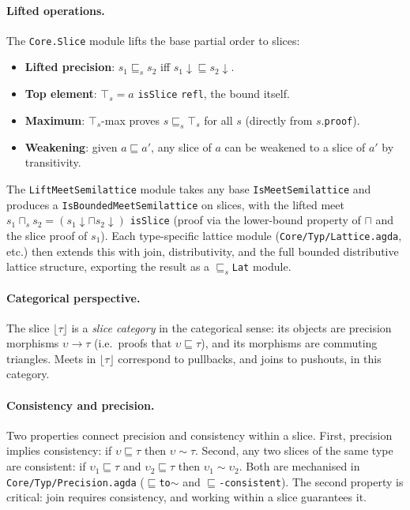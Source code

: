 \paragraph{Lifted operations.} The \texttt{Core.Slice} module lifts the base partial order to slices:
\begin{itemize}
\item \textbf{Lifted precision}: $s_1 \sqsubseteq_s s_2$ iff $s_1{\downarrow} \sqsubseteq s_2{\downarrow}$.
\item \textbf{Top element}: $\top_s = a$ \texttt{isSlice} \texttt{refl}, the bound itself.
\item \textbf{Maximum}: $\top_s$-max proves $s \sqsubseteq_s \top_s$ for all $s$ (directly from $s$.\texttt{proof}).
\item \textbf{Weakening}: given $a \sqsubseteq a'$, any slice of $a$ can be weakened to a slice of $a'$ by transitivity.
\end{itemize}
The \texttt{LiftMeetSemilattice} module takes any base \texttt{IsMeetSemilattice} and produces a \texttt{IsBoundedMeetSemilattice} on slices, with the lifted meet $s_1 \sqcap_s s_2 = (s_1{\downarrow} \sqcap s_2{\downarrow})$ \texttt{isSlice} (proof via the lower-bound property of $\sqcap$ and the slice proof of $s_1$). Each type-specific lattice module (\texttt{Core/Typ/Lattice.agda}, etc.) then extends this with join, distributivity, and the full bounded distributive lattice structure, exporting the result as a \texttt{$\sqsubseteq_s$Lat} module.

\paragraph{Categorical perspective.} The slice $\lfloor\tau\rfloor$ is a \textit{slice category} in the categorical sense: its objects are precision morphisms $\upsilon \to \tau$ (i.e.\ proofs that $\upsilon \sqsubseteq \tau$), and its morphisms are commuting triangles. Meets in $\lfloor\tau\rfloor$ correspond to pullbacks, and joins to pushouts, in this category.

\paragraph{Consistency and precision.} Two properties connect precision and consistency within a slice. First, precision implies consistency: if $\upsilon \sqsubseteq \tau$ then $\upsilon \sim \tau$. Second, any two slices of the same type are consistent: if $\upsilon_1 \sqsubseteq \tau$ and $\upsilon_2 \sqsubseteq \tau$ then $\upsilon_1 \sim \upsilon_2$. Both are mechanised in \texttt{Core/Typ/Precision.agda} (\texttt{$\sqsubseteq$to$\sim$} and \texttt{$\sqsubseteq$-consistent}). The second property is critical: join requires consistency, and working within a slice guarantees it.

